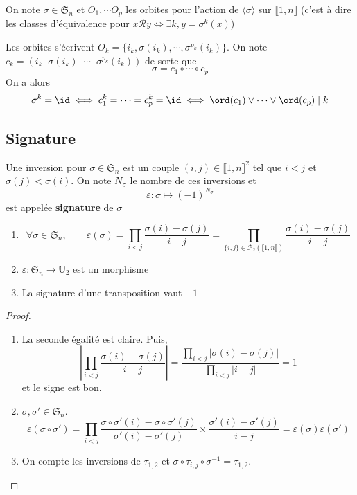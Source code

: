On note $\sigma \in\mathfrak S_n$ et $O_1, \cdots O_p$ les orbites pour l'action de $\langle \sigma \rangle$ sur $\llbracket1, n\rrbracket$ (c'est à dire les classes d'équivalence pour $x\mathcal Ry\iff \exists k, y=\sigma^k(x)$)

Les orbites s'écrivent $O_k=\{i_k, \sigma(i_k), \cdots, \sigma^{p_k}(i_k)\}$. On note $c_k=(i_k\;\;\sigma(i_k)\;\;\cdots\;\;\sigma^{p_k}(i_k))$ de sorte que \[
    \sigma=c_1\circ \cdots \circ c_p
\]
On a alors \[
    \sigma^k=\id \iff c_1^k=\cdots =c_p^k=\id \iff \ord(c_1)\lor \cdots \lor \ord(c_p)\;|\;k
\]

\subsection{Signature}

Une inversion pour $\sigma \in \mathfrak S_n$ est un couple $(i, j)\in\llbracket 1, n\rrbracket^2$ tel que $i<j$ et $\sigma(j)<\sigma(i)$. On note $N_\sigma$ le nombre de ces inversions et \[
    \varepsilon: \sigma\longmapsto (-1)^{N_\sigma}
\]
est appelée \textbf{signature} de $\sigma$

\begin{prop}
    \begin{enumerate}
        \item \[
                \forall \sigma\in\mathfrak S_n, \qquad \varepsilon(\sigma)=\prod_{i<j}\frac{\sigma(i)-\sigma(j)}{i-j}=\prod_{\{i, j\}\in \mathcal P_2(\llbracket 1, n\rrbracket)}\frac{\sigma(i)-\sigma(j)}{i-j}
            \]
        \item $\varepsilon:\mathfrak S_n\to \mathbb U_2$ est un morphisme
        \item La signature d'une transposition vaut $-1$
    \end{enumerate}
\end{prop}

\begin{proof}~
    \begin{enumerate}
        \item La seconde égalité est claire. Puis, \[
                \left| \prod_{i<j}\frac{\sigma(i)-\sigma(j)}{i-j} \right|=\frac{\prod_{i<j}|\sigma(i)-\sigma(j)|}{\prod_{i<j}|i-j|}=1
            \]
            et le signe est bon.
        \item $\sigma, \sigma'\in\mathfrak S_n$. \[
                \varepsilon(\sigma \circ \sigma')=\prod_{i<j}\frac{\sigma\circ \sigma'(i)-\sigma\circ \sigma'(j)}{\sigma'(i)-\sigma'(j)}\times \frac{\sigma'(i)-\sigma'(j)}{i-j}=\varepsilon(\sigma)\varepsilon(\sigma')
            \]
        \item On compte les inversions de $\tau_{1, 2}$ et $\sigma\circ \tau_{i, j}\circ \sigma^{-1}=\tau_{1, 2}$.
    \end{enumerate}
\end{proof}

